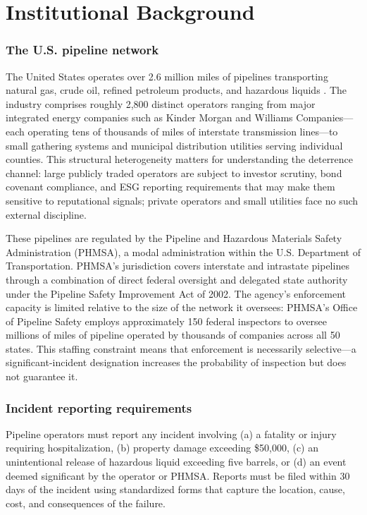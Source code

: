 \documentclass[12pt]{article}
\begin{document}
\section{Institutional Background}
\label{sec:background}

\subsubsection*{The U.S. pipeline network} The United States operates over 2.6 million miles of pipelines transporting natural gas, crude oil, refined petroleum products, and hazardous liquids \citep{phmsa2022report}. The industry comprises roughly 2,800 distinct operators ranging from major integrated energy companies such as Kinder Morgan and Williams Companies---each operating tens of thousands of miles of interstate transmission lines---to small gathering systems and municipal distribution utilities serving individual counties. This structural heterogeneity matters for understanding the deterrence channel: large publicly traded operators are subject to investor scrutiny, bond covenant compliance, and ESG reporting requirements that may make them sensitive to reputational signals; private operators and small utilities face no such external discipline.

These pipelines are regulated by the Pipeline and Hazardous Materials Safety Administration (PHMSA), a modal administration within the U.S. Department of Transportation. PHMSA's jurisdiction covers interstate and intrastate pipelines through a combination of direct federal oversight and delegated state authority under the Pipeline Safety Improvement Act of 2002. The agency's enforcement capacity is limited relative to the size of the network it oversees: PHMSA's Office of Pipeline Safety employs approximately 150 federal inspectors to oversee millions of miles of pipeline operated by thousands of companies across all 50 states. This staffing constraint means that enforcement is necessarily selective---a significant-incident designation increases the probability of inspection but does not guarantee it.

\subsubsection*{Incident reporting requirements} Pipeline operators must report any incident involving (a) a fatality or injury requiring hospitalization, (b) property damage exceeding \$50,000, (c) an unintentional release of hazardous liquid exceeding five barrels, or (d) an event deemed significant by the operator or PHMSA. Reports must be filed within 30 days of the incident using standardized forms that capture the location, cause, cost, and consequences of the failure.
\end{document}
